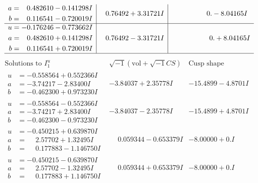 \documentclass[1p]{elsarticle_modified}
\theoremstyle{definition}
\newcommand{\I}{\sqrt{-1}}
\begin{document}
$$\begin{array}{c|c|c}
\begin{aligned}
a &= \phantom{-}0.482610 - 0.141298 I \\
b &= \phantom{-}0.116541 - 0.720019 I\end{aligned}
 & \phantom{-}0.76492 + 3.31721 I & \phantom{-0.000000 } 0. - 8.04165 I \\ \hline\begin{aligned}
u &= -0.176246 - 0.773662 I \\
a &= \phantom{-}0.482610 + 0.141298 I \\
b &= \phantom{-}0.116541 + 0.720019 I\end{aligned}
 & \phantom{-}0.76492 - 3.31721 I & \phantom{-0.000000 -}0. + 8.04165 I\\
 \hline 
 \end{array}$$\newpage$$\begin{array}{c|c|c}  
\text{Solutions to }I^u_{1}& \I (\text{vol} + \sqrt{-1}CS) & \text{Cusp shape}\\
 \hline 
\begin{aligned}
u &= -0.558564 + 0.552366 I \\
a &= -3.74217 - 2.83400 I \\
b &= -0.462300 + 0.973230 I\end{aligned}
 & -3.84037 + 2.35778 I & -15.4899 - 4.8701 I \\ \hline\begin{aligned}
u &= -0.558564 - 0.552366 I \\
a &= -3.74217 + 2.83400 I \\
b &= -0.462300 - 0.973230 I\end{aligned}
 & -3.84037 - 2.35778 I & -15.4899 + 4.8701 I \\ \hline\begin{aligned}
u &= -0.450215 + 0.639870 I \\
a &= \phantom{-}2.57702 + 1.32495 I \\
b &= \phantom{-}0.177883 - 1.146750 I\end{aligned}
 & \phantom{-}0.059344 - 0.653379 I & -8.00000 + 0. I\phantom{ +0.000000I} \\ \hline\begin{aligned}
u &= -0.450215 - 0.639870 I \\
a &= \phantom{-}2.57702 - 1.32495 I \\
b &= \phantom{-}0.177883 + 1.146750 I\end{aligned}
 & \phantom{-}0.059344 + 0.653379 I & -8.00000 + 0. I\phantom{ +0.000000I} \\ \hline\begin{aligned}

\end{aligned}
\end{array}$$
\end{document}
